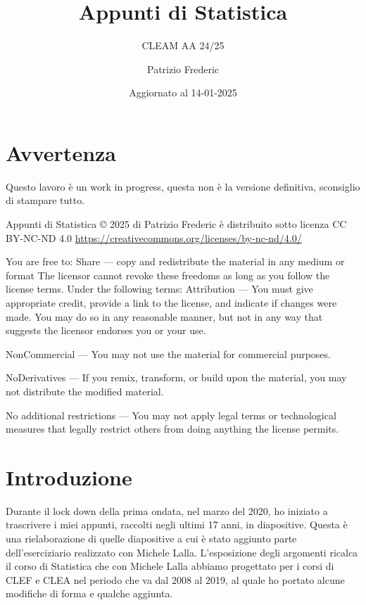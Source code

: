 \documentclass[
  11pt,
]{book}
\title{Appunti di Statistica}
\subtitle{CLEAM AA 24/25}
\author{Patrizio Frederic}
\date{Aggiornato al 14-01-2025}
\theoremstyle{mytheoremstyle}
\theoremstyle{mydefstyle}
\begin{document}
\maketitle

{
\setcounter{tocdepth}{2}
\tableofcontents
}
\chapter*{Avvertenza}\label{avvertenza}

\large

Questo lavoro è un work in progress, questa non è la versione definitiva, sconsiglio di stampare tutto.

\normalsize

Appunti di Statistica © 2025 di Patrizio Frederic è distribuito
sotto licenza CC BY-NC-ND 4.0
\url{https://creativecommons.org/licenses/by-nc-nd/4.0/}

You are free to:
Share --- copy and redistribute the material in any medium or format
The licensor cannot revoke these freedoms as long as you follow the license terms.
Under the following terms:
Attribution --- You must give appropriate credit, provide a link to the license, and indicate if changes were made. You may do so in any reasonable manner, but not in any way that suggests the licensor endorses you or your use.

NonCommercial --- You may not use the material for commercial purposes.

NoDerivatives --- If you remix, transform, or build upon the material, you may not distribute the modified material.

No additional restrictions --- You may not apply legal terms or technological measures that legally restrict others from doing anything the license permits.

\chapter*{Introduzione}\label{introduzione}

Durante il lock down della prima ondata, nel marzo del 2020, ho iniziato a trascrivere
i miei appunti, raccolti negli ultimi 17 anni, in diapositive. Questa è una rielaborazione
di quelle diapositive a cui è stato aggiunto parte dell'eserciziario realizzato con Michele Lalla.
L'esposizione degli argomenti ricalca il corso di Statistica che con Michele Lalla abbiamo
progettato per i corsi di CLEF e CLEA nel periodo che va dal 2008 al 2019, al quale ho
portato alcune modifiche di forma e qualche aggiunta.
\end{document}
